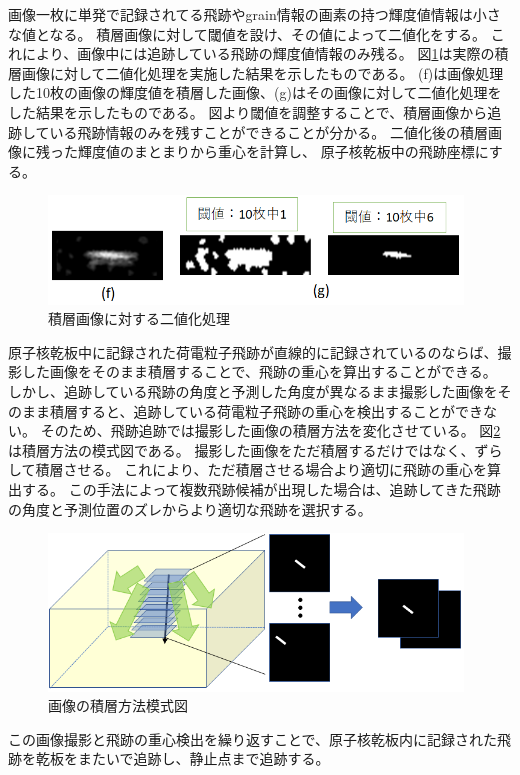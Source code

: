 \documentclass[12pt,a4paper]{jarticle}
\begin{document}
画像一枚に単発で記録されてる飛跡やgrain情報の画素の持つ輝度値情報は小さな値となる。
積層画像に対して閾値を設け、その値によって二値化をする。
これにより、画像中には追跡している飛跡の輝度値情報のみ残る。
図\ref{fig:sekisou_nitika}は実際の積層画像に対して二値化処理を実施した結果を示したものである。
(f)は画像処理した10枚の画像の輝度値を積層した画像、(g)はその画像に対して二値化処理をした結果を示したものである。
図より閾値を調整することで、積層画像から追跡している飛跡情報のみを残すことができることが分かる。
二値化後の積層画像に残った輝度値のまとまりから重心を計算し、
原子核乾板中の飛跡座標にする。
\begin{figure}[htbp]
  \centering
     \includegraphics[width=110mm]{tuiseki_gazou2.png}
  \caption{積層画像に対する二値化処理\label{fig:sekisou_nitika}}
\end{figure}
\par
原子核乾板中に記録された荷電粒子飛跡が直線的に記録されているのならば、撮影した画像をそのまま積層することで、飛跡の重心を算出することができる。
しかし、追跡している飛跡の角度と予測した角度が異なるまま撮影した画像をそのまま積層すると、追跡している荷電粒子飛跡の重心を検出することができない。
そのため、飛跡追跡では撮影した画像の積層方法を変化させている。
図\ref{fig:sekisou_mosikizu}は積層方法の模式図である。
撮影した画像をただ積層するだけではなく、ずらして積層させる。
これにより、ただ積層させる場合より適切に飛跡の重心を算出する。
この手法によって複数飛跡候補が出現した場合は、追跡してきた飛跡の角度と予測位置のズレからより適切な飛跡を選択する。
\begin{figure}[htbp]
  \centering
     \includegraphics[width=110mm]{sekisou_step3.png}
  \caption{画像の積層方法模式図\label{fig:sekisou_mosikizu}}
\end{figure}
\par
この画像撮影と飛跡の重心検出を繰り返すことで、原子核乾板内に記録された飛跡を乾板をまたいで追跡し、静止点まで追跡する。
\end{document}
